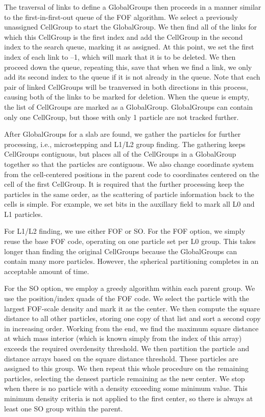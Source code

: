 The traversal of links to define a GlobalGroups then proceeds in a 
manner similar to the first-in-first-out queue of the FOF algorithm.
We select a previously unassigned CellGroup to start the GlobalGroup.
We then find all of the links for which this CellGroup is the first 
index and add the CellGroup in the second index to the search queue,
marking it as assigned.  At this point, we set the first index of 
each link to --1, which will mark that it is to be deleted.
We then proceed down the queue, repeating this, save that when we
find a link, we only add its second index to the queue if it is not
already in the queue.  Note that each pair of linked CellGroups
will be tranversed in both directions in this process, causing both
of the links to be marked for deletion.  When the queue is empty,
the list of CellGroups are marked as a GlobalGroup.  GlobalGroups
can contain only one CellGroup, but those with only 1 particle
are not tracked further.

After GlobalGroups for a slab are found, we gather the particles for
further processing, i.e., microstepping and L1/L2 group finding.  The
gathering keeps CellGroups contiguous, but places all of the CellGroups
in a GlobalGroup together so that the particles are contiguous.  We also
change coordinate system from the cell-centered positions in the parent
code to coordinates centered on the cell of the first CellGroup.  It
is required that the further processing keep the particles in the
same order, as the scattering of particle information back to the
cells is simple.  For example, we set bits in the auxillary field 
to mark all L0 and L1 particles.


For L1/L2 finding, we use either FOF or SO.  For the FOF option, we
simply reuse the base FOF code, operating on one particle set per L0
group.  This takes longer than finding the original CellGroups because
the GlobalGroups can contain many more particles.  However, the spherical
partitioning completes in an acceptable amount of time.

For the SO option, we employ a greedy algorithm within each parent
group.  We use the position/index quads of the FOF code.  We select
the particle with the largest FOF-scale density and mark it as the
center.  We then compute the square distance to all other particles,
storing one copy of that list and sort a second copy in increasing
order.  Working from the end, we find the maximum square distance
at which mass interior (which is known simply from the index of
this array) exceeds the required overdensity threshold.  We then
partition the particle and distance arrays based on the square
distance threshold.  These particles are assigned to this group.
We then repeat this whole procedure on the remaining particles,
selecting the densest particle remaining as the new center.  We stop
when there is no particle with a density exceeding some minimum
value.  This minimum density criteria is not applied to the first
center, so there is always at least one SO group within the parent.

